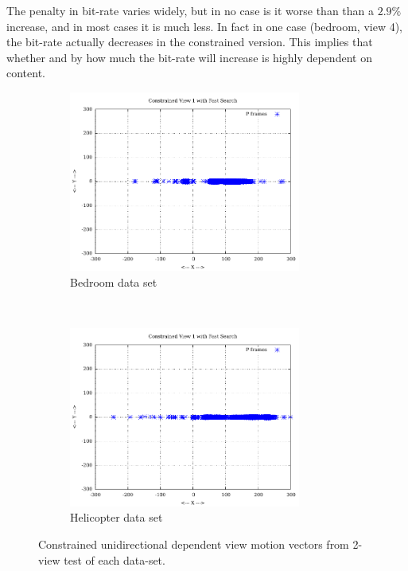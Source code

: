 \documentclass{sig-alternate-05-2015}
\begin{document}
The penalty in bit-rate varies widely, but in no case is it worse than than a
$2.9\%$ increase, and in most cases it is much less. In fact in one case
(bedroom, view 4), the bit-rate actually decreases in the constrained version.
This implies that whether and by how much the bit-rate will increase is highly
dependent on content.

\begin{figure}[H]
\centering
\begin{subfigure}{.5\textwidth}
\centering
\includegraphics[width=3in]{figures/bedroom1-inter-view-constrained-mvs.pdf}
\caption{Bedroom data set}
\label{fig:bedroom-inter-view-constrained-mvs}
\end{subfigure} \\
\begin{subfigure}{.5\textwidth}
\centering
\includegraphics[width=3in]{figures/helicopter-inter-view-constrained-mvs.pdf}
\caption{Helicopter data set}
\label{fig:helicopter-inter-view-constrained-mvs}
\end{subfigure}
\caption{Constrained unidirectional dependent view motion vectors from 2-view
test of each data-set.}
\label{fig:inter-view-constrained-mvs}
\end{figure}
\end{document}
